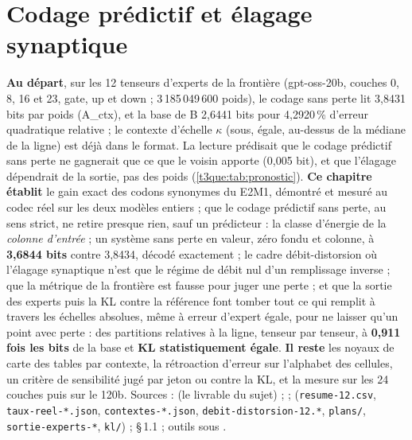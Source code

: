 \chapter{Codage prédictif et élagage synaptique}\label{t3pre:ch}

\begin{origine}
\textbf{Au départ}, sur les 12 tenseurs d'experts de la frontière (gpt-oss-20b, couches 0, 8, 16 et 23, gate, up et down ; 3\,185\,049\,600 poids), le codage sans perte lit 3,8431 bits par poids (A\_ctx), et la base de B 2,6441 bits pour 4,2920\,\% d'erreur quadratique relative ; le contexte d'échelle $\kappa$ (sous, égale, au-dessus de la médiane de la ligne) est déjà dans le format. La lecture prédisait que le codage prédictif sans perte ne gagnerait que ce que le voisin apporte (0,005 bit), et que l'élagage dépendrait de la sortie, pas des poids (\cref{t3que:tab:pronostic}).
\textbf{Ce chapitre établit} le gain exact des codons synonymes du E2M1, démontré et mesuré au codec réel sur les deux modèles entiers ; que le codage prédictif sans perte, au sens strict, ne retire presque rien, sauf un prédicteur : la classe d'énergie de la \emph{colonne d'entrée} ; un système sans perte en valeur, zéro fondu et colonne, à \textbf{3,6844 bits} contre 3,8434, décodé exactement ; le cadre débit-distorsion où l'élagage synaptique n'est que le régime de débit nul d'un remplissage inverse ; que la métrique de la frontière est fausse pour juger une perte ; et que la sortie des experts puis la KL contre la référence font tomber tout ce qui remplit à travers les échelles absolues, même à erreur d'expert égale, pour ne laisser qu'un point avec perte : des partitions relatives à la ligne, tenseur par tenseur, à \textbf{0,911 fois les bits} de la base et \textbf{KL statistiquement égale}.
\textbf{Il reste} les noyaux de carte des tables par contexte, la rétroaction d'erreur sur l'alphabet des cellules, un critère de sensibilité jugé par jeton ou contre la KL, et la mesure sur les 24 couches puis sur le 120b.
Sources :  (le livrable du sujet) ;  ;  (\texttt{resume-12.csv}, \texttt{taux-reel-*.json}, \texttt{contextes-*.json}, \texttt{debit-distorsion-12.*}, \texttt{plans/}, \texttt{sortie-experts-*}, \texttt{kl/}) ;  §\,1.1 ; outils sous .
\end{origine}

